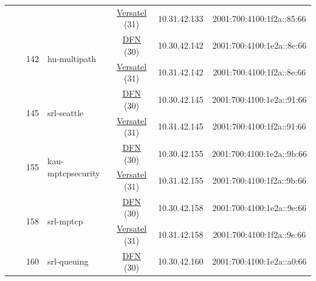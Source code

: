 \begin{small}
\begin{center}
\begin{longtable}{|c|c|c|c|c|c|c|c|}
  &  &  &  & \multicolumn{2}{|c|}{\tiny{\href{http://www.versatel.de}{Versatel} (31)}} & \tiny{10.31.42.133} & \tiny{2001:700:4100:1f2a::85:66} \\* \cline{3-3}\cline{4-4}\cline{5-5}\cline{6-6}\cline{7-7}\cline{8-8}
  &  & \multirow{2}{*}{\tiny{142}} & \multicolumn{1}{|l|}{\multirow{2}{*}{\tiny{hu-multipath}}} & \multicolumn{2}{|c|}{\tiny{\href{https://www.dfn.de}{DFN} (30)}} & \tiny{10.30.42.142} & \tiny{2001:700:4100:1e2a::8e:66} \\* \cline{5-5}\cline{6-6}\cline{7-7}\cline{8-8}
  &  &  &  & \multicolumn{2}{|c|}{\tiny{\href{http://www.versatel.de}{Versatel} (31)}} & \tiny{10.31.42.142} & \tiny{2001:700:4100:1f2a::8e:66} \\* \cline{3-3}\cline{4-4}\cline{5-5}\cline{6-6}\cline{7-7}\cline{8-8}
  &  & \multirow{2}{*}{\tiny{145}} & \multicolumn{1}{|l|}{\multirow{2}{*}{\tiny{srl-seattle}}} & \multicolumn{2}{|c|}{\tiny{\href{https://www.dfn.de}{DFN} (30)}} & \tiny{10.30.42.145} & \tiny{2001:700:4100:1e2a::91:66} \\* \cline{5-5}\cline{6-6}\cline{7-7}\cline{8-8}
  &  &  &  & \multicolumn{2}{|c|}{\tiny{\href{http://www.versatel.de}{Versatel} (31)}} & \tiny{10.31.42.145} & \tiny{2001:700:4100:1f2a::91:66} \\* \cline{3-3}\cline{4-4}\cline{5-5}\cline{6-6}\cline{7-7}\cline{8-8}
  &  & \multirow{2}{*}{\tiny{155}} & \multicolumn{1}{|l|}{\multirow{2}{*}{\tiny{kau-mptcpsecurity}}} & \multicolumn{2}{|c|}{\tiny{\href{https://www.dfn.de}{DFN} (30)}} & \tiny{10.30.42.155} & \tiny{2001:700:4100:1e2a::9b:66} \\* \cline{5-5}\cline{6-6}\cline{7-7}\cline{8-8}
  &  &  &  & \multicolumn{2}{|c|}{\tiny{\href{http://www.versatel.de}{Versatel} (31)}} & \tiny{10.31.42.155} & \tiny{2001:700:4100:1f2a::9b:66} \\* \cline{3-3}\cline{4-4}\cline{5-5}\cline{6-6}\cline{7-7}\cline{8-8}
  &  & \multirow{2}{*}{\tiny{158}} & \multicolumn{1}{|l|}{\multirow{2}{*}{\tiny{srl-mptcp}}} & \multicolumn{2}{|c|}{\tiny{\href{https://www.dfn.de}{DFN} (30)}} & \tiny{10.30.42.158} & \tiny{2001:700:4100:1e2a::9e:66} \\* \cline{5-5}\cline{6-6}\cline{7-7}\cline{8-8}
  &  &  &  & \multicolumn{2}{|c|}{\tiny{\href{http://www.versatel.de}{Versatel} (31)}} & \tiny{10.31.42.158} & \tiny{2001:700:4100:1f2a::9e:66} \\* \cline{3-3}\cline{4-4}\cline{5-5}\cline{6-6}\cline{7-7}\cline{8-8}
  &  & \multirow{2}{*}{\tiny{160}} & \multicolumn{1}{|l|}{\multirow{2}{*}{\tiny{srl-queuing}}} & \multicolumn{2}{|c|}{\tiny{\href{https://www.dfn.de}{DFN} (30)}} & \tiny{10.30.42.160} & \tiny{2001:700:4100:1e2a::a0:66} \\* \cline{5-5}\cline{6-6}\cline{7-7}\cline{8-8}

\end{longtable}
\end{center}
\end{small}
